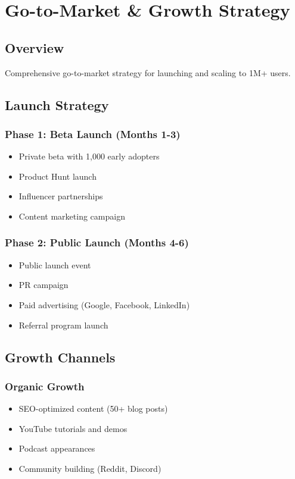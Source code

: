 \chapter{Go-to-Market \& Growth Strategy}
\label{ch:go-to-market}

\section{Overview}
Comprehensive go-to-market strategy for launching and scaling \lifeos{} to 1M+ users.

\section{Launch Strategy}

\subsection{Phase 1: Beta Launch (Months 1-3)}
\begin{itemize}
    \item Private beta with 1,000 early adopters
    \item Product Hunt launch
    \item Influencer partnerships
    \item Content marketing campaign
\end{itemize}

\subsection{Phase 2: Public Launch (Months 4-6)}
\begin{itemize}
    \item Public launch event
    \item PR campaign
    \item Paid advertising (Google, Facebook, LinkedIn)
    \item Referral program launch
\end{itemize}

\section{Growth Channels}

\subsection{Organic Growth}
\begin{itemize}
    \item SEO-optimized content (50+ blog posts)
    \item YouTube tutorials and demos
    \item Podcast appearances
    \item Community building (Reddit, Discord)
\end{itemize}

